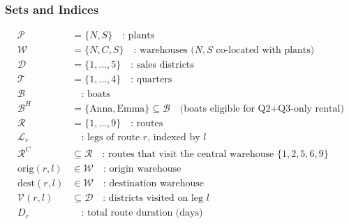 \documentclass[10pt]{article}
\begin{document}
\subsubsection{Sets and Indices}
\begin{align}
    \mathcal{P} &= \{N, S\} \quad\text{: plants}\\
    \mathcal{W} &= \{N, C, S\}\quad\text{: warehouses ($N, S $ co-located with plants)}\\
    \mathcal{D} &= \{1, \dots, 5\}\quad\text{: sales districts}\\
    \mathcal{T} &= \{1, \dots, 4\}\quad\text{: quarters}\\
    \mathcal{B} &\quad\text{: boats}\\
    \mathcal{B}^H &= \{\text{Anna}, \text{Emma}\} \subseteq \mathcal{B} \quad \text{(boats eligible for Q2+Q3-only rental)}\\
    \mathcal{R} &= \{1, \dots, 9\}\quad\text{: routes}\\
    \mathcal{L}_r&\quad\text{: legs of route $r $, indexed by $l $}\\
    \mathcal{R}^C&\subseteq \mathcal{R} \quad\text{: routes that visit the central warehouse $\{1, 2, 5, 6, 9\}$}\\
    \text{orig}(r, l)&\in \mathcal{W}\quad\text{: origin warehouse}\\
    \text{dest}(r, l)&\in \mathcal{W}\quad\text{: destination warehouse}\\
    \mathcal{V}(r, l)&\subseteq \mathcal{D}\quad\text{: districts visited on leg $l $}\\
    D_r&\quad\text{: total route duration (days)}
\end{align}
\end{document}

